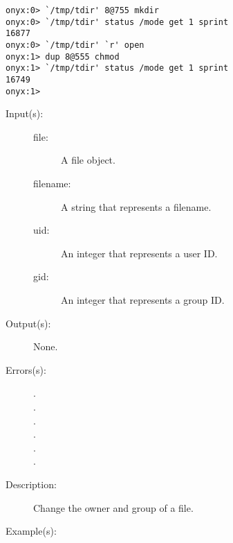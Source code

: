 \begin{description}
\begin{description}
\begin{verbatim}
onyx:0> `/tmp/tdir' 8@755 mkdir 
onyx:0> `/tmp/tdir' status /mode get 1 sprint
16877
onyx:0> `/tmp/tdir' `r' open 
onyx:1> dup 8@555 chmod
onyx:1> `/tmp/tdir' status /mode get 1 sprint
16749
onyx:1>
		\end{verbatim}
	\end{description}
\label{systemdict:chown}
\item[{\onyxop{file/filename uid gid}{chown}{--}}: ]
	\begin{description}\item[]
	\item[Input(s): ]
		\begin{description}\item[]
		\item[file: ]
			A file object.
		\item[filename: ]
			A string that represents a filename.
		\item[uid: ]
			An integer that represents a user ID.
		\item[gid: ]
			An integer that represents a group ID.
		\end{description}
	\item[Output(s): ] None.
	\item[Errors(s): ]
		\begin{description}\item[]
		\item[.]
		\item[.]
		\item[.]
		\item[.]
		\item[.]
		\item[.]
		\end{description}
	\item[Description: ]
		Change the owner and group of a file.
	\item[Example(s): ]\begin{verbatim}


\end{verbatim}
\end{description}
\end{description}
